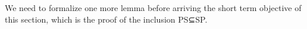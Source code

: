 \begin{code}
\AgdaSymbol{\}\{}\AgdaSymbol{\}}\AgdaSpace{}%
\AgdaSymbol{)}\<%
\\
%
\\[\AgdaEmptyExtraSkip]%
%
\>[2]\AgdaSpace{}%
\AgdaSymbol{:}\AgdaSpace{}%
\AgdaSpace{}%
\AgdaSpace{}%
\AgdaSymbol{\{}\AgdaSpace{}%
\AgdaSpace{}%
\AgdaSymbol{\}\{}\AgdaSpace{}%
\AgdaSpace{}%
\AgdaSymbol{\}}\AgdaSpace{}%
\AgdaSymbol{(}\AgdaSymbol{\{}\AgdaSymbol{\}\{}\AgdaSymbol{\}}\AgdaSpace{}%
\AgdaSymbol{)}\<%
\\
%
\>[2]\AgdaSpace{}%
\AgdaSymbol{=}\AgdaSpace{}%
\AgdaSymbol{\{}\AgdaSpace{}%
\AgdaSpace{}%
\AgdaSymbol{\}\{}\AgdaSpace{}%
\AgdaSpace{}%
\AgdaSymbol{\}\{}\AgdaSymbol{\{}\AgdaSymbol{\}\{}\AgdaSymbol{\}}\AgdaSpace{}%
\AgdaSymbol{\}\{}\AgdaSymbol{\}}\AgdaSpace{}%
\<%
\\
%
\\[\AgdaEmptyExtraSkip]%
%
\>[2]\AgdaSpace{}%
\AgdaSymbol{:}\AgdaSpace{}%
\AgdaSpace{}%
\AgdaSpace{}%
\<%
\\
%
\>[2]\AgdaSpace{}%
\AgdaSymbol{=}\AgdaSpace{}%
\AgdaSpace{}%
\AgdaSpace{}%
\AgdaSpace{}%
\AgdaSymbol{(}\AgdaSpace{}%
\AgdaSymbol{)}\AgdaSpace{}%
\<%
\\
\>[0]\<%
\end{code}

We need to formalize one more lemma before arriving the short term
objective of this section, which is the proof of the inclusion PS⊆SP.

